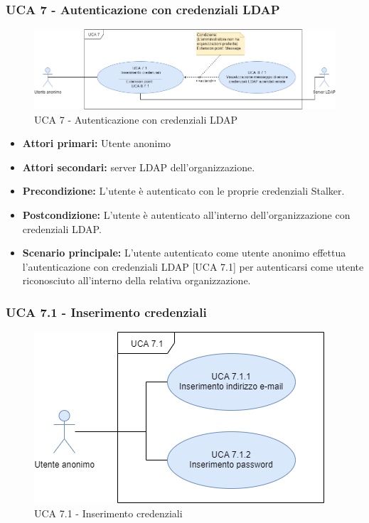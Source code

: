 


\subsubsection{UCA 7 - Autenticazione con credenziali LDAP}%

\begin{figure}[h]
	\centering
	\includegraphics[scale=0.4, center]{sezioni/UseCase/Immagini/UCA7.png}
	\caption{UCA 7 - Autenticazione con credenziali LDAP}
\end{figure}

\begin{itemize}
	\item \textbf{Attori primari:} Utente anonimo 
	\item \textbf{Attori secondari:} server LDAP dell'organizzazione.
	\item \textbf{Precondizione:} L'utente è autenticato con le proprie credenziali Stalker.
	\item \textbf{Postcondizione:} L'utente è autenticato all'interno dell'organizzazione con credenziali LDAP.
	\item \textbf{Scenario principale:} L'utente autenticato come utente anonimo effettua l'autenticazione con credenziali LDAP [UCA 7.1] per autenticarsi come utente riconosciuto all'interno della relativa organizzazione.
\end{itemize}

\subsubsection{UCA 7.1 - Inserimento credenziali}
\begin{figure}[h]
	\centering
	\includegraphics[scale=0.5, center]{sezioni/UseCase/Immagini/UCA7.1.png}
	\caption{UCA 7.1 - Inserimento credenziali}
\end{figure}

